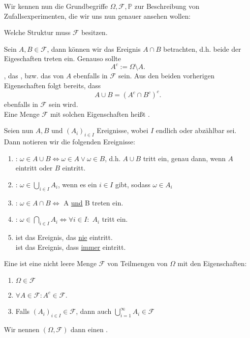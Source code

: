 Wir kennen nun die Grundbegriffe $\Omega, \mathcal{F}, \mathbb{P}$ zur Beschreibung von Zufallsexperimenten, die wir uns nun genauer ansehen wollen:
\begin{question}
    Welche Struktur muss $\mathcal{F}$ besitzen.
\end{question}
Sein $A,B\in \mathcal{F}$, dann können wir das Ereignis $A \cap B$ betrachten, d.h. beide der Eigeschaften treten ein. Genauso sollte
 \[
A^{c} := \Omega \setminus A 
.\] 
, das , bzw. das  von $A$ ebenfalls in  $\mathcal{F}$  sein. Aus den beiden vorherigen Eigenschaften folgt bereits, dass
\[
    A \cup B= (A^{c} \cap B^{c})^{c}
.\] 
ebenfalls in $\mathcal{F}$ sein wird. \\
Eine Menge $\mathcal{F}$ mit solchen Eigenschaften heißt .
\begin{dnotation}
Seien nun $A,B$ und $(A_i)_{i\in I}$  Ereignisse, wobei $I$ endlich oder abzählbar sei. Dann notieren wir die folgenden Ereignisse:
\begin{enumerate}[label=\protect\circled{\alph*}]
    \item {} : $ω\in A \cup B \iff  ω\in A \lor ω\in B$, d.h. $A\cup B$ tritt ein, genau dann, wenn  $A$ eintritt oder  $B$ eintritt.
        \item  {}: $ω\in \bigcup_{i \in  I} A_i$, wenn es ein $i\in I$ gibt, sodass $\omega \in A_i$
    \item  {}: $\omega\in A \cap B \iff  $ A \underline{und} B treten ein.
        \item {}: $\omega\in \bigcap_{i \in I}A_i \iff \forall i \in I \colon$ $A_i$ tritt ein.
            \item {} ist das Ereignis, das  \underline{nie} eintritt. \\
                 ist das Ereignis, dass \underline{immer} eintritt.
\end{enumerate}
\end{dnotation}

\begin{definition}\label{def:sigma-algebra}
    Eine   ist eine nicht leere Menge $\mathcal{F}$ von Teilmengen von $\Omega$ mit den Eigenschaften:
    \begin{enumerate}[label=\protect\circled{\alph*}]
        \item $\Omega \in \mathcal{F}$
        \item $\forall A\in \mathcal{F} \colon A^{c}\in \mathcal{F}$.
        \item Falls $(A_i)_{i \in I}\in \mathcal{F}$, dann auch $\bigcup_{i=1} ^{\infty}A_i \in \mathcal{F}$
    \end{enumerate}
    Wir nennen $(\Omega,\mathcal{F})$ dann einen . 
\end{definition}

